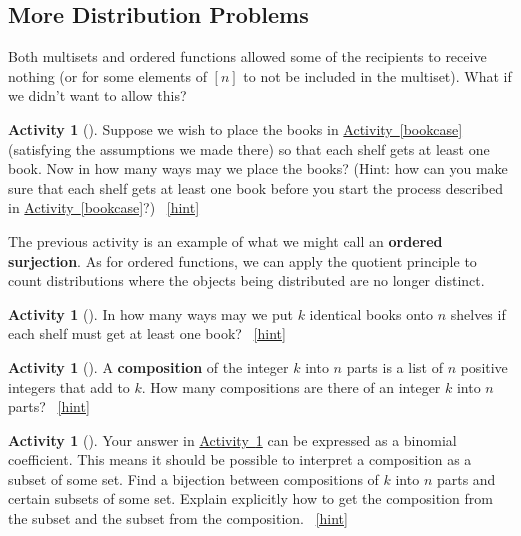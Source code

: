 \documentclass[10pt,]{book}
\newcommand{\terminology}[1]{\textbf{#1}}
\theoremstyle{plain}
\theoremstyle{definition}
\theoremstyle{definition}
\theoremstyle{definition}
\newtheorem{activity}[project]{Activity}
\numberwithin{equation}{chapter}
\begin{document}
\subsection[{More Distribution Problems}]{More Distribution Problems}\label{subsec-moredistributions}
\hypertarget{p-857}{}%
Both multisets and ordered functions allowed some of the recipients to receive nothing (or for some elements of \([n]\) to not be included in the multiset).  What if we didn't want to allow this?%
\begin{activity}[]\label{bookcaseeveryshelf}
\hypertarget{p-858}{}%
Suppose we wish to place the books in \hyperref[bookcase]{Activity~\ref{bookcase}} (satisfying the assumptions we made there) so that each shelf gets at least one book. Now in how many ways may we place the books? (Hint: how can you make sure that each shelf gets at least one book before you start the process described in \hyperref[bookcase]{Activity~\ref{bookcase}}?)%
~\hfill{\tiny\hyperlink{a-126}{[hint]}\hypertarget{q-126}{}}\end{activity}
\hypertarget{p-861}{}%
The previous activity is an example of what we might call an \terminology{ordered surjection}.  As for ordered functions, we can apply the quotient principle to count distributions where the objects being distributed are no longer distinct.%
\begin{activity}[]\label{activity-120}
\hypertarget{p-862}{}%
In how many ways may we put \(k\) identical books onto \(n\) shelves if each shelf must get at least one book?%
~\hfill{\tiny\hyperlink{a-127}{[hint]}\hypertarget{q-127}{}}\end{activity}
\begin{activity}[]\label{compositionagian}
\hypertarget{p-865}{}%
A \terminology{composition} of the integer \(k\) into \(n\) parts is a list of \(n\) positive integers that add to \(k\).  How many compositions are there of an integer \(k\) into \(n\) parts?%
~\hfill{\tiny\hyperlink{a-128}{[hint]}\hypertarget{q-128}{}}\end{activity}
\begin{activity}[]\label{activity-122}
\hypertarget{p-868}{}%
Your answer in \hyperref[compositionagian]{Activity~\ref{compositionagian}} can be expressed as a binomial coefficient. This means it should be possible to interpret a composition as a subset of some set. Find a bijection between compositions of \(k\) into \(n\) parts and certain subsets of some set.  Explain explicitly how to get the composition from the subset and the subset from the composition.%
~\hfill{\tiny\hyperlink{a-129}{[hint]}\hypertarget{q-129}{}}\end{activity}
\end{document}
